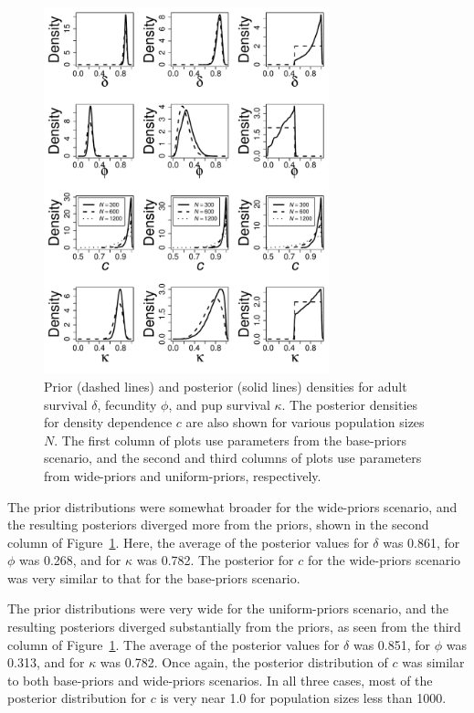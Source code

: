 \documentclass[]{risa}\usepackage[]{graphicx}\usepackage[]{color}
\begin{document}
\begin{figure}[b]
\centerline{
  \includegraphics[width=3.25in]{plot-demparms-1.pdf}
}
  \caption{Prior (dashed lines) and posterior (solid lines) densities for adult survival $\delta$, fecundity $\phi$, and pup survival $\kappa$. The posterior densities for density dependence $c$ are also shown for various population sizes $N$. The first column of plots use parameters from the base-priors scenario, and the second and third columns of plots use parameters from wide-priors and uniform-priors, respectively. }  
\label{plot-demparms}       
\end{figure}


The prior distributions were somewhat broader for the wide-priors scenario, and the resulting posteriors diverged more from the priors, shown in the second column of Figure~\ref{plot-demparms}. Here, the average of the posterior values for $\delta$ was 0.861, for $\phi$ was 0.268, and for $\kappa$ was 0.782. The posterior for $c$ for the wide-priors scenario was very similar to that for the base-priors scenario.

The prior distributions were very wide for the uniform-priors scenario, and the resulting posteriors diverged substantially from the priors, as seen from the third column of Figure~\ref{plot-demparms}. The average of the posterior values for $\delta$ was 0.851, for $\phi$ was 0.313, and for $\kappa$ was 0.782. Once again, the posterior distribution of $c$ was similar to both base-priors and wide-priors scenarios.  In all three cases, most of the posterior distribution for $c$ is very near 1.0 for population sizes less than 1000.
\end{document}
